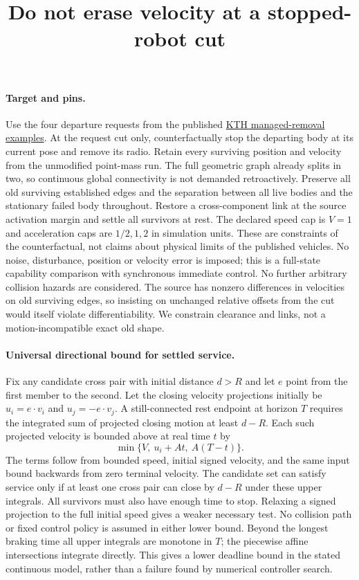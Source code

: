 \documentclass{article}
\title{Do not erase velocity at a stopped-robot cut}
\date{}
\begin{document}
\maketitle

\paragraph{Target and pins.}
Use the four departure requests from the published
\href{https://arxiv.org/html/2609.29939v1}{KTH managed-removal examples}.
At the request cut only, counterfactually stop the departing body at
its current pose and remove its radio. Retain every surviving
position and velocity from the unmodified point-mass run. The full
geometric graph already splits in two, so continuous global
connectivity is not demanded retroactively. Preserve all old surviving
established edges and the separation between all live bodies and the
stationary failed body throughout. Restore a cross-component link
at the source activation margin and settle all survivors at rest.
The declared speed cap is $V=1$ and acceleration caps are $1/2,1,2$
in simulation units. These are constraints of the counterfactual,
not claims about physical limits of the published vehicles. No noise,
disturbance, position or velocity error is imposed; this is a
full-state capability comparison with synchronous immediate control.
No further arbitrary collision hazards are considered.
The source has nonzero differences in velocities on old surviving
edges, so insisting on unchanged relative offsets from the cut
would itself violate differentiability. We constrain clearance and
links, not a motion-incompatible exact old shape.

\paragraph{Universal directional bound for settled service.}
Fix any candidate cross pair with initial distance $d>R$ and let
$e$ point from the first member to the second. Let the closing
velocity projections initially be $u_i=e\cdot v_i$ and
$u_j=-e\cdot v_j$. A still-connected rest endpoint at horizon $T$
requires the integrated sum of projected closing motion at least
$d-R$. Each such projected velocity is bounded above at real time
$t$ by
\[
\min\{V,\ u_i+At,\ A(T-t)\}.
\]
The terms follow from bounded speed, initial signed velocity, and
the same input bound backwards from zero terminal velocity. The
candidate set can satisfy service only if at least one cross pair
can close by $d-R$ under these upper integrals. All survivors must
also have enough time to stop. Relaxing a signed projection to the
full initial speed gives a weaker necessary test. No collision path
or fixed control policy is assumed in either lower bound. Beyond
the longest braking time all upper integrals are monotone in $T$;
the piecewise affine intersections integrate directly. This gives
a lower deadline bound in the stated continuous model, rather than
a failure found by numerical controller search.
\end{document}
